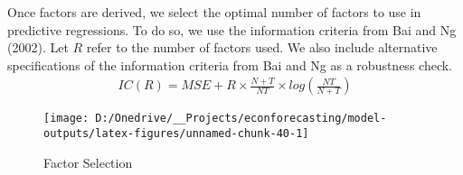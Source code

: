 \documentclass[11pt, letterpaper]{article}\usepackage[]{graphicx}\usepackage[]{color}
\begin{document}
Once factors are derived, we select the optimal number of factors to use in predictive regressions. To do so, we use the information criteria from Bai and Ng (2002). Let $R$ refer to the number of factors used. We also include alternative specifications of the information criteria from Bai and Ng as a robustness check.
\begin{align*}
	IC(R) = MSE + R \times \frac{N+T}{NT} \times log\left(\frac{NT}{N+T}\right)
\end{align*}

\begin{figure}[H]

{\centering \texttt{[image: D:/Onedrive/\_\_Projects/econforecasting/model-outputs/latex-figures/unnamed-chunk-40-1]} 

}

\caption[Factor Selection]{Factor Selection}\label{fig:unnamed-chunk-40}
\end{figure}
\end{document}
